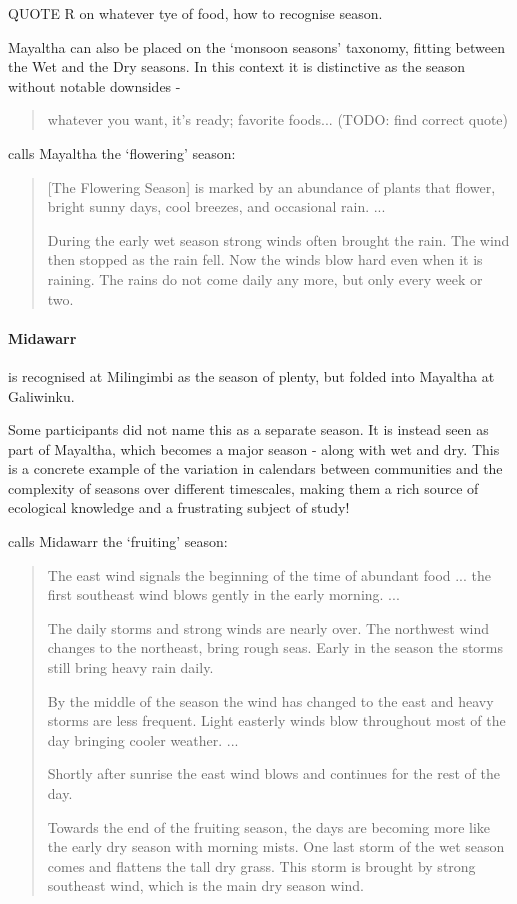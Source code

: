 QUOTE R on whatever tye of food, how to recognise season.

Mayaltha can also be placed on the `monsoon seasons' taxonomy, fitting
between the Wet and the Dry seasons.  In this context it is distinctive
as the season without notable downsides - \blockquote{
    whatever you want, it's ready; favorite foods... (TODO: find correct quote)
}.

\citet{davis1989} calls Mayaltha the `flowering' season:
\blockquote{
    [The Flowering Season] is marked by an abundance of plants that flower,
    bright sunny days, cool breezes, and occasional rain. ...
    
    During the early wet season strong winds often brought the rain.
    The wind then stopped as the rain fell.
    Now the winds blow hard even when it is raining.
    The rains do not come daily any more, but only every week or two.
}


\paragraph{Midawarr} is recognised at Milingimbi as the season of plenty,
but folded into Mayaltha at Galiwinku.

Some participants did not name this as a separate season.
It is instead seen as part of Mayaltha, which becomes a major season - along with wet and dry.
This is a concrete example of the variation in calendars between
communities and the complexity of seasons over different timescales,
making them a rich source of ecological knowledge and a frustrating subject of study!

\citet{davis1989} calls Midawarr the `fruiting' season:
\blockquote{
    The east wind signals the beginning of the time of abundant food ...
    the first southeast wind blows gently in the early morning. ...
    
    The daily storms and strong winds are nearly over.
    The northwest wind changes to the northeast, bring rough seas.
    Early in the season the storms still bring heavy rain daily.
    
    By the middle of the season the wind has changed to the east and heavy storms are less frequent.
    Light easterly winds blow throughout most of the day bringing cooler weather. ...
    
    Shortly after sunrise the east wind blows and continues for the rest of the day.
    
    Towards the end of the fruiting season, the days are becoming
    more like the early dry season with morning mists.
    One last storm of the wet season comes and flattens the tall dry grass.
    This storm is brought by strong southeast wind, which is the main dry season wind.
}



